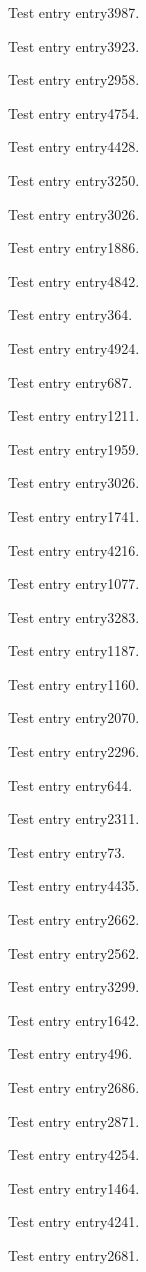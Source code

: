 Test entry \gls{entry3987}.

Test entry \gls{entry3923}.

Test entry \gls{entry2958}.

Test entry \gls{entry4754}.

Test entry \gls{entry4428}.

Test entry \gls{entry3250}.

Test entry \gls{entry3026}.

Test entry \gls{entry1886}.

Test entry \gls{entry4842}.

Test entry \gls{entry364}.

Test entry \gls{entry4924}.

Test entry \gls{entry687}.

Test entry \gls{entry1211}.

Test entry \gls{entry1959}.

Test entry \gls{entry3026}.

Test entry \gls{entry1741}.

Test entry \gls{entry4216}.

Test entry \gls{entry1077}.

Test entry \gls{entry3283}.

Test entry \gls{entry1187}.

Test entry \gls{entry1160}.

Test entry \gls{entry2070}.

Test entry \gls{entry2296}.

Test entry \gls{entry644}.

Test entry \gls{entry2311}.

Test entry \gls{entry73}.

Test entry \gls{entry4435}.

Test entry \gls{entry2662}.

Test entry \gls{entry2562}.

Test entry \gls{entry3299}.

Test entry \gls{entry1642}.

Test entry \gls{entry496}.

Test entry \gls{entry2686}.

Test entry \gls{entry2871}.

Test entry \gls{entry4254}.

Test entry \gls{entry1464}.

Test entry \gls{entry4241}.

Test entry \gls{entry2681}.

